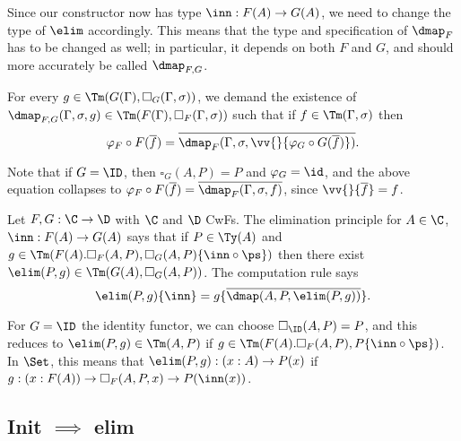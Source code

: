 \documentclass{article}
\begin{document}
Since our constructor now has type $\inn : F(A) \to G(A)$, we need to
change the type of $\elim$ accordingly. This means that the type and
specification of $\dmap_F$ has to be changed as well; in particular,
it depends on both $F$ and $G$, and should more accurately be called $\dmap_{F,G}$.

\begin{definition}
For every $g \in \Tm(G(\Gamma), \square_G(\Gamma, \sigma))$, we demand the existence of
$\dmap_{F,G}(\Gamma, \sigma, g) \in \Tm(F(\Gamma), \square_F(\Gamma, \sigma))$
such that if $f \in \Tm(\Gamma, \sigma)$ then
\[
\varphi_F \circ F(\overline{f}) = \overline{\dmap_F(\Gamma, \sigma,
  \vv{}\{\varphi_G \circ G(\overline{f})\})}.
\]
\end{definition}

Note that if $G = \ID$, then $\square_G(A, P) = P$ and $\varphi_G =
\id$, and the above equation collapses to $\varphi_F \circ
F(\overline{f}) = \overline{\dmap_F(\Gamma, \sigma, f)}$, since $\vv{}\{\overline{f}\} = f$.


Let $F, G : \C \to \D$ with $\C$ and $\D$ CwFs. The elimination
principle for $A \in \C$, $\inn : F(A) \to G(A)$ says that if $P \in
\Ty(A)$ and $g \in \Tm(F(A).\square_F(A, P), \square_G(A, P)\{\inn
\circ \ps\})$ then there exist $\elim(P, g) \in \Tm(G(A), \square_G(A,
P))$. The computation rule says
\[
\elim(P, g)\{\inn\} = g\{\overline{\dmap(A, P, \elim(P, g))}\}.
\]

For $G = \ID$ the identity functor, we can choose $\square_{\ID}(A, P)
= P$, and this reduces to $\elim(P, g) \in \Tm(A, P)$ if $g \in
\Tm(F(A).\square_F(A, P), P\{\inn \circ \ps\})$. In $\Set$, this means
that $\elim(P, g) : (x : A) \to P(x)$ if $g : (x : F(A)) \to
\square_F(A, P, x) \to P(\inn(x))$.


\subsection{Init $\implies$ elim}
\end{document}
